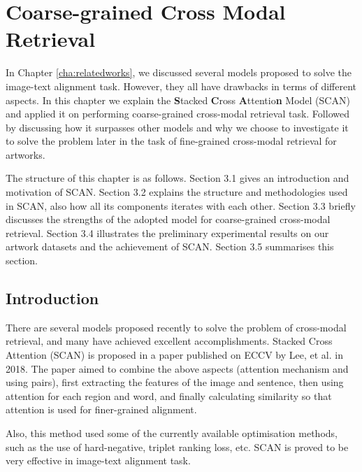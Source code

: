 \chapter{Coarse-grained Cross Modal Retrieval}
\label{cha:scan}
In Chapter \ref{cha:relatedworks}, we discussed several models proposed to solve the image-text alignment task. However, they all have drawbacks in terms of different aspects. In this chapter we explain the \textbf{S}tacked \textbf{C}ross \textbf{A}ttentio\textbf{n} Model (SCAN) \cite{scan} and applied it on performing coarse-grained cross-modal retrieval task. Followed by discussing how it surpasses other models and why we choose to investigate it to solve the problem later in the task of fine-grained cross-modal retrieval for artworks.

The structure of this chapter is as follows. Section 3.1 gives an introduction and motivation of SCAN. Section 3.2 explains the structure and methodologies used in SCAN, also how all its components iterates with each other. Section 3.3 briefly discusses the strengths of the adopted model for coarse-grained cross-modal retrieval. Section 3.4 illustrates the preliminary experimental results on our artwork datasets and the achievement of SCAN. Section 3.5 summarises this section.


\section{Introduction}

There are several models proposed recently to solve the problem of cross-modal retrieval, and many have achieved excellent accomplishments. Stacked Cross Attention (SCAN) is proposed in a paper published on ECCV by Lee, et al. \cite{scan} in 2018. The paper aimed to combine the above aspects (attention mechanism and using pairs), first extracting the features of the image and sentence, then using attention for each region and word, and finally calculating similarity so that attention is used for finer-grained alignment.

Also, this method used some of the currently available optimisation methods, such as the use of hard-negative, triplet ranking loss, etc. SCAN is proved to be very effective in image-text alignment task.


